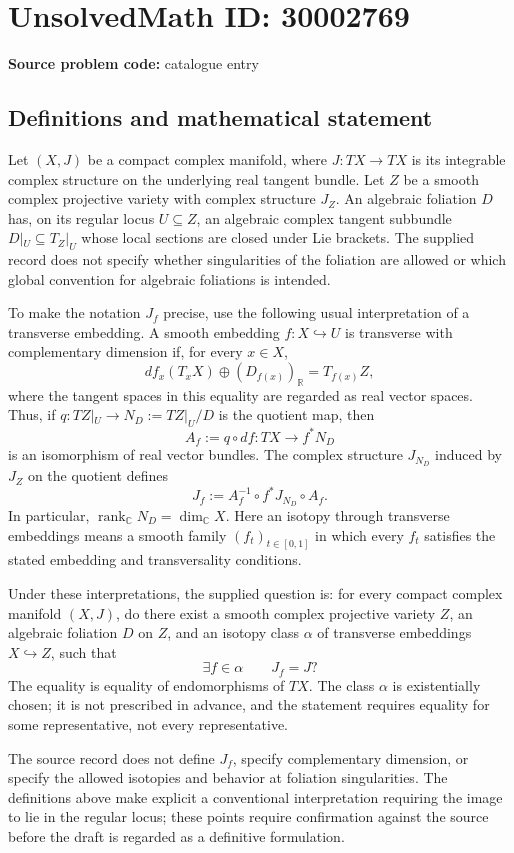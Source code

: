 \documentclass[11pt]{article}
\newcommand{\R}{\mathbb{R}}
\newcommand{\C}{\mathbb{C}}
\begin{document}
\section*{UnsolvedMath ID: 30002769}
\textbf{Source problem code:} catalogue entry
\subsection{Definitions and mathematical statement}
Let \((X,J)\) be a compact complex manifold, where \(J\colon TX\to TX\) is its integrable complex structure on the underlying real tangent bundle. Let \(Z\) be a smooth complex projective variety with complex structure \(J_Z\). An algebraic foliation \(D\) has, on its regular locus \(U\subseteq Z\), an algebraic complex tangent subbundle \(D|_U\subseteq T_Z|_U\) whose local sections are closed under Lie brackets. The supplied record does not specify whether singularities of the foliation are allowed or which global convention for algebraic foliations is intended.

To make the notation \(J_f\) precise, use the following usual interpretation of a transverse embedding. A smooth embedding \(f\colon X\hookrightarrow U\) is transverse with complementary dimension if, for every \(x\in X\),
\[
 df_x(T_xX)\oplus (D_{f(x)})_{\R}=T_{f(x)}Z,
\]
where the tangent spaces in this equality are regarded as real vector spaces. Thus, if \(q\colon TZ|_U\to N_D:=TZ|_U/D\) is the quotient map, then
\[
 A_f:=q\circ df\colon TX\longrightarrow f^*N_D
\]
is an isomorphism of real vector bundles. The complex structure \(J_{N_D}\) induced by \(J_Z\) on the quotient defines
\[
 J_f:=A_f^{-1}\circ f^*J_{N_D}\circ A_f.
\]
In particular, \(\operatorname{rank}_{\C}N_D=\dim_{\C}X\). Here an isotopy through transverse embeddings means a smooth family \((f_t)_{t\in[0,1]}\) in which every \(f_t\) satisfies the stated embedding and transversality conditions.

Under these interpretations, the supplied question is: for every compact complex manifold \((X,J)\), do there exist a smooth complex projective variety \(Z\), an algebraic foliation \(D\) on \(Z\), and an isotopy class \(\alpha\) of transverse embeddings \(X\hookrightarrow Z\), such that
\[
 \exists f\in\alpha\qquad J_f=J?
\]
The equality is equality of endomorphisms of \(TX\). The class \(\alpha\) is existentially chosen; it is not prescribed in advance, and the statement requires equality for some representative, not every representative.

The source record does not define \(J_f\), specify complementary dimension, or specify the allowed isotopies and behavior at foliation singularities. The definitions above make explicit a conventional interpretation requiring the image to lie in the regular locus; these points require confirmation against the source before the draft is regarded as a definitive formulation.
\end{document}
